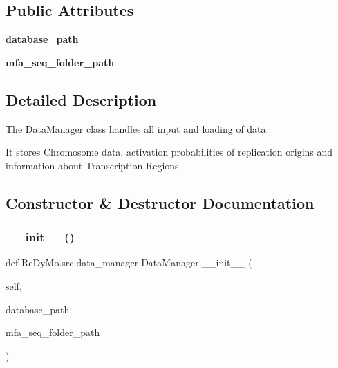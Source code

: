 \subsection*{Public Attributes}
\begin{DoxyCompactItemize}
\item 
\mbox{\label{classReDyMo_1_1src_1_1data__manager_1_1DataManager_a2b02f39a632fbbc2c5b6de552ca83272}} 
{\bfseries database\+\_\+path}
\item 
\mbox{\label{classReDyMo_1_1src_1_1data__manager_1_1DataManager_ad2ca521773db409a2e8032c788970b4f}} 
{\bfseries mfa\+\_\+seq\+\_\+folder\+\_\+path}
\end{DoxyCompactItemize}


\subsection{Detailed Description}
The \mbox{\hyperlink{classReDyMo_1_1src_1_1data__manager_1_1DataManager}{Data\+Manager}} class handles all input and loading of data. 

It stores Chromosome data, activation probabilities of replication origins and information about Transcription Regions. 

\subsection{Constructor \& Destructor Documentation}
\mbox{\label{classReDyMo_1_1src_1_1data__manager_1_1DataManager_a27b99e0e717df27a816eb1d2db550847}} 
\subsubsection{\texorpdfstring{\+\_\+\+\_\+init\+\_\+\+\_\+()}{\_\_init\_\_()}}
{\footnotesize\ttfamily def Re\+Dy\+Mo.\+src.\+data\+\_\+manager.\+Data\+Manager.\+\_\+\+\_\+init\+\_\+\+\_\+ (\begin{DoxyParamCaption}\item[{}]{self,  }\item[{}]{database\+\_\+path,  }\item[{}]{mfa\+\_\+seq\+\_\+folder\+\_\+path }\end{DoxyParamCaption})}



